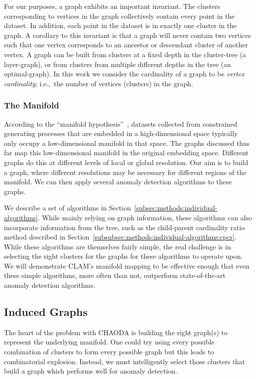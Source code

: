For our purposes, a graph exhibits an important invariant.
The clusters corresponding to vertices in the graph collectively contain every point in the dataset.
In addition, each point in the dataset is in exactly one cluster in the graph.
A corollary to this invariant is that a graph will never contain two vertices such that one vertex corresponds to an ancestor or descendant cluster of another vertex.
A graph can be built from clusters at a fixed depth in the cluster-tree (a layer-graph), or from clusters from multiple different depths in the tree (an optimal-graph).
In this work we consider the cardinality of a graph to be \textit{vertex cardinality}; i.e.,\ the number of vertices (clusters) in the graph.

\subsubsection{The Manifold}
According to the ``manifold hypothesis''~\cite{fefferman2016testing}, datasets collected from constrained generating processes that are embedded in a high-dimensional space typically only occupy a low-dimensional manifold in that space.
The graphs discussed thus far map this low-dimensional manifold in the original embedding space.
Different graphs do this at different levels of local or global resolution.
Our aim is to build a graph, where different resolutions may be necessary for different regions of the manifold.
We can then apply several anomaly detection algorithms to these graphs.

We describe a set of algorithms in Section~\ref{subsec:methods:individual-algorithms}.
While mainly relying on graph information, these algorithms can also incorporate information from the tree, such as the child-parent cardinality ratio method described in Section~\ref{subsubsec:methods:individual-algorithms:cpcr}.
While these algorithms are themselves fairly simple, the real challenge is in selecting the right clusters for the graphs for these algorithms to operate upon.
We will demonstrate CLAM's manifold mapping to be effective enough that even these simple algorithms, more often than not, outperform state-of-the-art anomaly detection algorithms.


\subsection{Induced Graphs}
\label{subsec:methods:induced-graphs}

The heart of the problem with CHAODA is building the right graph(s) to represent the underlying manifold.
One could try using every possible combination of clusters to form every possible graph but this leads to combinatorial explosion.
Instead, we must intelligently select those clusters that build a graph which performs well for anomaly detection.

